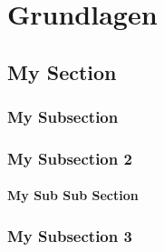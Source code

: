 \chapter{Grundlagen}
\label{cha:grundlagen}





\section{My Section}
\blindtext

\subsection{My Subsection}
\blindtext

\subsection{My Subsection 2}
\sblindtext

\subsubsection{My Sub Sub Section}
\sblindtext

\subsection{My Subsection 3}
\blindtext
